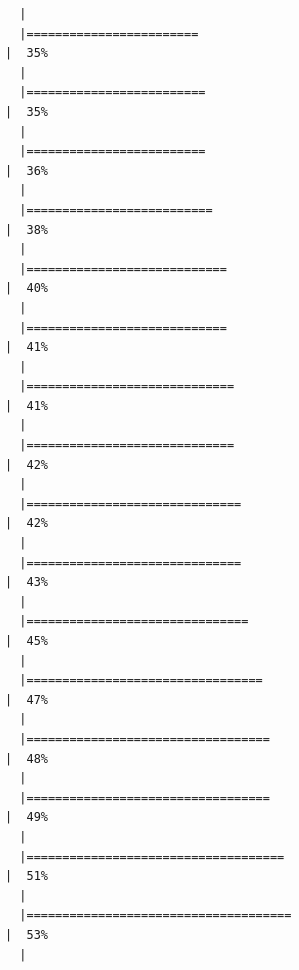 \documentclass[
  letterpaper,
  DIV=11,
  numbers=noendperiod]{scrreprt}
\begin{document}
\begin{verbatim}
  |                                                                            
  |========================                                              |  35%
  |                                                                            
  |=========================                                             |  35%
  |                                                                            
  |=========================                                             |  36%
  |                                                                            
  |==========================                                            |  38%
  |                                                                            
  |============================                                          |  40%
  |                                                                            
  |============================                                          |  41%
  |                                                                            
  |=============================                                         |  41%
  |                                                                            
  |=============================                                         |  42%
  |                                                                            
  |==============================                                        |  42%
  |                                                                            
  |==============================                                        |  43%
  |                                                                            
  |===============================                                       |  45%
  |                                                                            
  |=================================                                     |  47%
  |                                                                            
  |==================================                                    |  48%
  |                                                                            
  |==================================                                    |  49%
  |                                                                            
  |====================================                                  |  51%
  |                                                                            
  |=====================================                                 |  53%
  |                                                                            

\end{verbatim}
\end{document}
